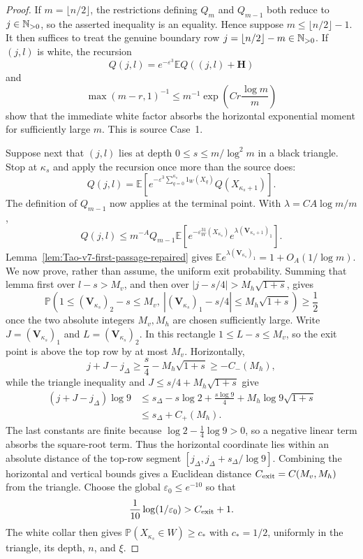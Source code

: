 \begin{proof}
If \(m=\lfloor n/2\rfloor\), the restrictions defining \(Q_m\) and
\(Q_{m-1}\) both reduce to \(j\in\mathbb{N}_{>0}\), so the asserted inequality is an
equality.  Hence suppose \(m\le\lfloor n/2\rfloor-1\).  It then suffices to
treat the genuine boundary row
\(j=\lfloor n/2\rfloor-m\in\mathbb{N}_{>0}\).
If \((j,l)\) is white, the recursion
\[
 Q(j,l)=e^{-\varepsilon^3}\mathbb E Q((j,l)+\mathbf H)
\]
and
\[
 \max(m-r,1)^{-1}\le m^{-1}
 \exp\left(Cr\frac{\log m}{m}\right)
\]
show that the immediate white factor absorbs the horizontal exponential
moment for sufficiently large \(m\).  This is source Case~1.

Suppose next that \((j,l)\) lies at depth
\(0\le s\le m/\log^2m\) in a black triangle.  Stop at \(\kappa_s\) and
apply the recursion once more than the source does:
\[
 Q(j,l)=\mathbb E\left[
 e^{-\varepsilon^3\sum_{q=0}^{\kappa_s}1_W(X_q)}
 Q(X_{\kappa_s+1})\right].
\]
The definition of \(Q_{m-1}\) now applies at the terminal point.  With
\(\lambda=CA\log m/m\),
\[
 Q(j,l)\le m^{-A}Q_{m-1}
 \mathbb E\left[e^{-\varepsilon^31_W(X_{\kappa_s})}
 e^{\lambda(\mathbf V_{\kappa_s+1})_1}\right].
\]
Lemma~\ref{lem:Tao-v7-first-passage-repaired} gives
\(\mathbb E e^{\lambda(\mathbf V_{\kappa_s})_1}
=1+O_A(1/\log m)\).  We now prove, rather than assume, the uniform exit
probability.  Summing that lemma first over
\(l-s>M_v\), and then over
\(|j-s/4|>M_h\sqrt{1+s}\), gives
\[
 \mathbb P\left(
  1\le(\mathbf V_{\kappa_s})_2-s\le M_v,
  \ |(\mathbf V_{\kappa_s})_1-s/4|
       \le M_h\sqrt{1+s}
 \right)\ge\frac12
\]
once the two absolute integers \(M_v,M_h\) are chosen sufficiently large.
Write \(J=(\mathbf V_{\kappa_s})_1\) and
\(L=(\mathbf V_{\kappa_s})_2\).  In this rectangle
\(1\le L-s\le M_v\), so the exit point is above the top row by at most
\(M_v\).  Horizontally,
\[
 j+J-j_\Delta\ge \frac s4-M_h\sqrt{1+s}\ge-C_-(M_h),
\]
while the triangle inequality and \(J\le s/4+M_h\sqrt{1+s}\) give
\begin{align*}
 (j+J-j_\Delta)\log9
 &\le s_\Delta-s\log2+\frac{s\log9}{4}
       +M_h\log9\sqrt{1+s}\\
 &\le s_\Delta+C_+(M_h).
\end{align*}
The last constants are finite because
\(\log2-\frac14\log9>0\), so a negative linear term absorbs the square-root
term.  Thus the horizontal coordinate lies within an absolute distance of
the top-row segment
\([j_\Delta,j_\Delta+s_\Delta/\log9]\).  Combining the horizontal and
vertical bounds gives a Euclidean distance
\(C_{\rm exit}=C(M_v,M_h)\) from the triangle.  Choose the global
\(\varepsilon_0\le e^{-10}\) so that
\[
 \frac1{10}\log(1/\varepsilon_0)>C_{\rm exit}+1.
\]
The white collar then gives
\(\mathbb P(X_{\kappa_s}\in W)\ge c_*\) with \(c_*=1/2\), uniformly in
the triangle, its depth, \(n\), and \(\xi\).


\end{proof}
